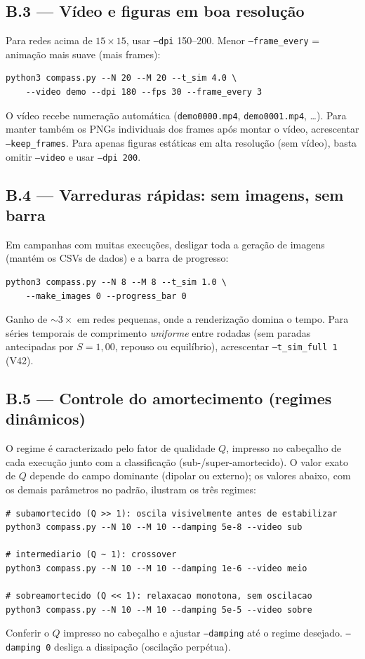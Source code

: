 \documentclass[11pt,a4paper]{article}
\newcommand{\code}[1]{\texttt{#1}}
\begin{document}
\subsection*{B.3 --- Vídeo e figuras em boa resolução}

Para redes acima de $15\times15$, usar \code{--dpi} 150--200. Menor
\code{--frame\_every} = animação mais suave (mais frames):
\begin{verbatim}
python3 compass.py --N 20 --M 20 --t_sim 4.0 \
    --video demo --dpi 180 --fps 30 --frame_every 3
\end{verbatim}
O vídeo recebe numeração automática (\code{demo0000.mp4},
\code{demo0001.mp4}, \dots). Para manter também os PNGs individuais dos
frames após montar o vídeo, acrescentar \code{--keep\_frames}. Para
apenas figuras estáticas em alta resolução (sem vídeo), basta omitir
\code{--video} e usar \code{--dpi 200}.

\subsection*{B.4 --- Varreduras rápidas: sem imagens, sem barra}

Em campanhas com muitas execuções, desligar toda a geração de imagens
(mantém os CSVs de dados) e a barra de progresso:
\begin{verbatim}
python3 compass.py --N 8 --M 8 --t_sim 1.0 \
    --make_images 0 --progress_bar 0
\end{verbatim}
Ganho de $\sim 3\times$ em redes pequenas, onde a renderização domina o
tempo. Para séries temporais de comprimento \emph{uniforme} entre
rodadas (sem paradas antecipadas por $S{=}1{,}00$, repouso ou
equilíbrio), acrescentar \code{--t\_sim\_full 1} (V42).

\subsection*{B.5 --- Controle do amortecimento (regimes dinâmicos)}

O regime é caracterizado pelo fator de qualidade $Q$, impresso no
cabeçalho de cada execução junto com a classificação
(sub-/super-amortecido). O valor exato de $Q$ depende do campo
dominante (dipolar ou externo); os valores abaixo, com os demais
parâmetros no padrão, ilustram os três regimes:
\begin{verbatim}
# subamortecido (Q >> 1): oscila visivelmente antes de estabilizar
python3 compass.py --N 10 --M 10 --damping 5e-8 --video sub

# intermediario (Q ~ 1): crossover
python3 compass.py --N 10 --M 10 --damping 1e-6 --video meio

# sobreamortecido (Q << 1): relaxacao monotona, sem oscilacao
python3 compass.py --N 10 --M 10 --damping 5e-5 --video sobre
\end{verbatim}
Conferir o $Q$ impresso no cabeçalho e ajustar \code{--damping} até o
regime desejado. \code{--damping 0} desliga a dissipação (oscilação
perpétua).
\end{document}
